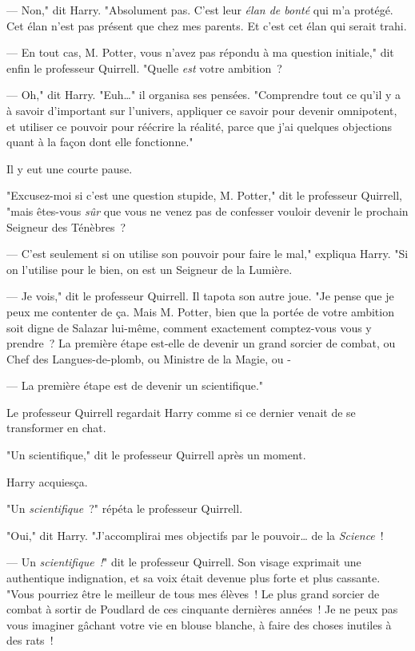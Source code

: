 --- Non," dit Harry. "Absolument pas. C'est leur \emph{élan de bonté} qui m'a protégé. Cet élan n'est pas présent que chez mes parents. Et c'est cet élan qui serait trahi.

--- En tout cas, M. Potter, vous n'avez pas répondu à ma question initiale," dit enfin le professeur Quirrell. "Quelle \emph{est} votre ambition~?

--- Oh," dit Harry. "Euh…" il organisa ses pensées. "Comprendre tout ce qu'il y a à savoir d'important sur l'univers, appliquer ce savoir pour devenir omnipotent, et utiliser ce pouvoir pour réécrire la réalité, parce que j'ai quelques objections quant à la façon dont elle fonctionne."

Il y eut une courte pause.

"Excusez-moi si c'est une question stupide, M. Potter," dit le professeur Quirrell, "mais êtes-vous \emph{sûr} que vous ne venez pas de confesser vouloir devenir le prochain Seigneur des Ténèbres~?

--- C'est seulement si on utilise son pouvoir pour faire le mal," expliqua Harry. "Si on l'utilise pour le bien, on est un Seigneur de la Lumière.

--- Je vois," dit le professeur Quirrell. Il tapota son autre joue. "Je pense que je peux me contenter de ça. Mais M. Potter, bien que la portée de votre ambition soit digne de Salazar lui-même, comment exactement comptez-vous vous y prendre~? La première étape est-elle de devenir un grand sorcier de combat, ou Chef des Langues-de-plomb, ou Ministre de la Magie, ou -

--- La première étape est de devenir un scientifique."

Le professeur Quirrell regardait Harry comme si ce dernier venait de se transformer en chat.

"Un scientifique," dit le professeur Quirrell après un moment.

Harry acquiesça.

"Un \emph{scientifique}~?" répéta le professeur Quirrell.

"Oui," dit Harry. "J'accomplirai mes objectifs par le pouvoir… de la \emph{Science}~!

--- Un \emph{scientifique~!}" dit le professeur Quirrell. Son visage exprimait une authentique indignation, et sa voix était devenue plus forte et plus cassante. "Vous pourriez être le meilleur de tous mes élèves~! Le plus grand sorcier de combat à sortir de Poudlard de ces cinquante dernières années~! Je ne peux pas vous imaginer gâchant votre vie en blouse blanche, à faire des choses inutiles à des rats~!


